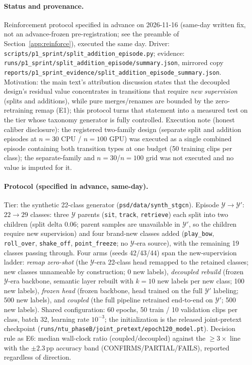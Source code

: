 \documentclass[11pt,a4paper]{article}
\begin{document}
\paragraph{Status and provenance.}
Reinforcement protocol specified in advance on 2026-11-16 (same-day written fix, not an advance-frozen pre-registration; see the preamble of Section~\ref{app:reinforce}), executed the same day. Driver: \texttt{scripts/p1\_sprint/split\_addition\_episode.py}; evidence: \texttt{runs/p1\_sprint/split\_addition\_episode/summary.json}, mirrored copy \texttt{reports/p1\_sprint\_evidence/split\_addition\_episode\_summary.json}. Motivation: the main text's attribution discussion states that the decoupled design's residual value concentrates in transitions that require \emph{new supervision} (splits and additions), while pure merges/renames are bounded by the zero-retraining remap (E1); this protocol turns that statement into a measured test on the tier whose taxonomy generator is fully controlled. Execution note (honest caliber disclosure): the registered two-family design (separate split and addition episodes at $n{=}30$ CPU / $n{=}100$ GPU) was executed as a single combined episode containing both transition types at one budget (50 training clips per class); the separate-family and $n{=}30$/$n{=}100$ grid was not executed and no value is imputed for it.

\paragraph{Protocol (specified in advance, same-day).}
Tier: the synthetic 22-class generator (\texttt{psd/data/synth\_stgcn}). Episode $\mathcal{Y}\to\mathcal{Y}'$: $22\to29$ classes: three $\mathcal{Y}$ parents (\texttt{sit}, \texttt{track}, \texttt{retrieve}) each split into two children (split delta 0.06; parent samples are unavailable in $\mathcal{Y}'$, so the children require new supervision) and four brand-new classes added (\texttt{play\_bow}, \texttt{roll\_over}, \texttt{shake\_off}, \texttt{point\_freeze}; no $\mathcal{Y}$-era source), with the remaining 19 classes passing through. Four arms (seeds 42/43/44) span the new-supervision ladder: \emph{remap zero-shot} (the $\mathcal{Y}$-era 22-class head remapped to the retained classes; new classes unnameable by construction; 0 new labels), \emph{decoupled rebuild} (frozen $\mathcal{Y}$-era backbone, semantic layer rebuilt with $k{=}10$ new labels per new class; 100 new labels), \emph{frozen head} (frozen backbone, head trained on the full $\mathcal{Y}'$ labeling; 500 new labels), and \emph{coupled} (the full pipeline retrained end-to-end on $\mathcal{Y}'$; 500 new labels). Shared configuration: 60 epochs, 50 train / 10 validation clips per class, batch 32, learning rate $10^{-3}$; the initialization is the released joint-pretext checkpoint (\texttt{runs/ntu\_phaseB/joint\_pretext/epoch120\_model.pt}). Decision rule as E6: median wall-clock ratio (coupled/decoupled) against the $\geq3\times$ line with the $\pm2.3$\,pp accuracy band (CONFIRMS/PARTIAL/FAILS), reported regardless of direction.
\end{document}
